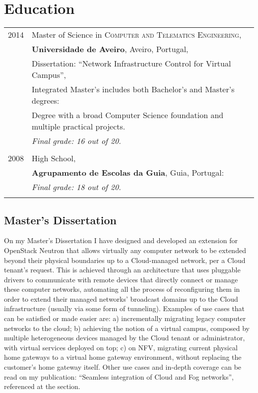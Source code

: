\documentclass[letter,10pt]{article} %
\begin{document}

\section{Education}

\begin{tabular}{rl}	
\textsc{2014} & Master of Science in \textsc{Computer and Telematics Engineering}, \\
&\textbf{Universidade de Aveiro}, Aveiro, Portugal, \\
& Dissertation: ``Network Infrastructure Control for Virtual Campus'', \\
& Integrated Master's includes both Bachelor's and Master's degrees: \\
& Degree with a broad Computer Science foundation and multiple practical projects.\\
& \textit{Final grade: 16 out of 20.}\\
&\\

\textsc{2008} & High School, \\
&\textbf{Agrupamento de Escolas da Guia}, Guia, Portugal: \\
& \textit{Final grade: 18 out of 20.}\\
&\\
\end{tabular}

\subsection{Master's Dissertation}
On my Master's Dissertation I have designed and developed an extension for OpenStack Neutron that allows virtually any computer network to be extended beyond their physical boundaries up to a Cloud-managed network, per a Cloud tenant's request. This is achieved through an architecture that uses pluggable drivers to communicate with remote devices that directly connect or manage these computer networks, automating all the process of reconfiguring them in order to extend their managed networks' broadcast domains up to the Cloud infrastructure (usually via some form of tunneling). Examples of use cases that can be satisfied or made easier are: a) incrementally migrating legacy computer networks to the cloud; b) achieving the notion of a virtual campus, composed by multiple heterogeneous devices managed by the Cloud tenant or administrator, with virtual services deployed on top; c) on NFV, migrating current physical home gateways to a virtual home gateway environment, without replacing the customer's home gateway itself. Other use cases and in-depth coverage can be read on my publication: ``Seamless integration of Cloud and Fog networks'', referenced at the  section.
\end{document}

